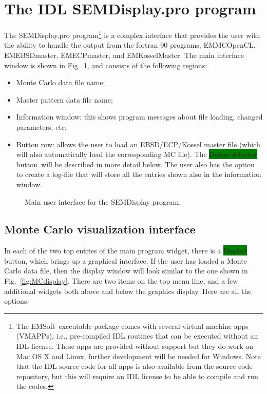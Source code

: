 \documentclass[DIV=calc, paper=letter, fontsize=11pt]{scrartcl}	 %
\newcommand{\ctp}{\textsf{EMSoft}}
\newcommand{\button}[1]{\colorbox{green}{\textsf{#1}} button}
\begin{document}
\section{The IDL \protect\textsf{SEMDisplay.pro} program\label{sec:idl}}
The \textsf{SEMDisplay.pro} program\footnote{The \ctp\ executable package comes with several virtual machine apps (VMAPPs), 
i.e., pre-compiled IDL routines that can be executed without an IDL license.  These apps are provided without support but they do work 
on Mac OS X and Linux; further development will be needed for Windows.  Note that the IDL source code for all apps is also available from
the source code repository, but this will require an IDL license to be able to compile and run the codes.} is a complex interface that provides the user with the ability to handle the 
output from the fortran-90 programs, \textsf{EMMCOpenCL}, \textsf{EMEBSDmaster}, \textsf{EMECPmaster}, and \textsf{EMKosselMaster}.  The main
interface window is shown in Fig.~\ref{fig:EBSDmain}, and consists of the following regions:
\begin{itemize}
	\item Monte Carlo data file name;
	\item Master pattern data file name;
	\item Information window: this shows program messages about file loading, changed parameters, etc.
	\item Button row: allows the user to load an EBSD/ECP/Kossel master file (which will also automatically load the 
	corresponding MC file).  The \button{Define detector}\ will be described in more detail below.  The user also has the option to 
	create a log-file that will store all the entries shown also in the information window.
\end{itemize}

\begin{figure}[t]
\leavevmode\centering
\epsfxsize=3in
\caption{\label{fig:EBSDmain}Main user interface for the SEMDisplay program.}
\end{figure}

\subsection{Monte Carlo visualization interface\label{sec:idlMC}}
In each of the two top entries of the main program widget, there is a \button{Display}, which brings up a graphical interface.  If the user has loaded a Monte Carlo data file, 
then the display window will look similar to the one shown in Fig.~\ref{fig:MCdisplay}.  There are two items on the top menu line, and a few additional widgets both 
above and below the graphics display.  Here are all the options:
\end{document}
